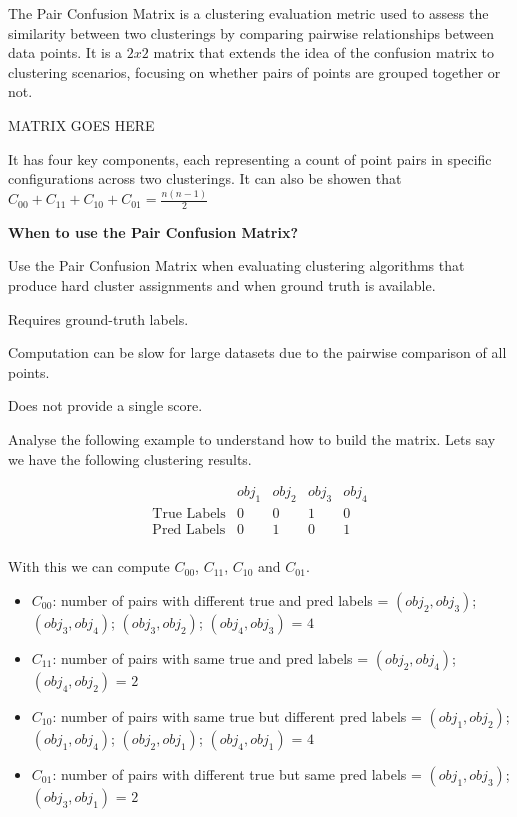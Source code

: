 The Pair Confusion Matrix is a clustering evaluation metric used to assess the similarity between two clusterings by
comparing pairwise relationships between data points. It is a $2x2$ matrix that extends the idea of the confusion matrix
to clustering scenarios, focusing on whether pairs of points are grouped together or not.

\begin{center}
    MATRIX GOES HERE
\end{center}

It has four key components, each representing a count of point pairs in specific configurations across two clusterings. It can
also be showen that $C_{00} + C_{11} + C_{10} + C_{01} = \frac{n(n-1)}{2}$

\textbf{When to use the Pair Confusion Matrix?}

Use the Pair Confusion Matrix when evaluating clustering algorithms that produce hard cluster assignments and when ground truth
is available.

{
    \item Requires ground-truth labels.    
    \item Computation can be slow for large datasets due to the pairwise comparison of all points.
    \item Does not provide a single score.
}

\clearpage

\thispagestyle{customstyle}

Analyse the following example to understand how to build the matrix. Lets say we have the following clustering results.

\[
\begin{array}{l|cccccc}
    & \text{$obj_{1}$} & \text{$obj_{2}$} & \text{$obj_{3}$} & \text{$obj_{4}$} \\
\hline
\text{True Labels} & 0 & 0 & 1 & 0 \\
\text{Pred Labels} & 0 & 1 & 0 & 1 \\
\end{array}
\]

With this we can compute $C_{00}$, $C_{11}$, $C_{10}$ and $C_{01}$.

\begin{itemize}
    \item $C_{00}$: number of pairs with different true and pred labels = $(obj_{2}, obj_{3})$; $(obj_{3}, obj_{4})$; $(obj_{3}, obj_{2})$; $(obj_{4}, obj_{3})$ = $4$
    \item $C_{11}$: number of pairs with same true and pred labels = $(obj_{2}, obj_{4})$; $(obj_{4}, obj_{2})$ = $2$
    \item $C_{10}$: number of pairs with same true but different pred labels = $(obj_{1}, obj_{2})$; $(obj_{1}, obj_{4})$;
    $(obj_{2}, obj_{1})$; $(obj_{4}, obj_{1})$ = $4$
    \item $C_{01}$: number of pairs with different true but same pred labels = $(obj_{1}, obj_{3})$; $(obj_{3}, obj_{1})$ = $2$
\end{itemize}

